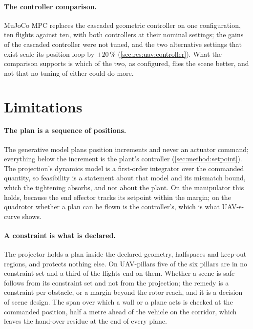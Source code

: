 \paragraph{The controller comparison.} MuJoCo MPC replaces the cascaded geometric controller on one
configuration, ten flights against ten, with both controllers at their nominal settings; the gains of
the cascaded controller were not tuned, and the two alternative settings that exist scale its position
loop by $\pm20\,\%$ (\autoref{sec:res:uav:controller}). What the comparison supports is which of the
two, as configured, flies the scene better, and not that no tuning of either could do more.

\section{Limitations}\label{sec:disc:limitations}

\paragraph{The plan is a sequence of positions.} The generative model plans position increments and
never an actuator command; everything below the increment is the plant's controller
(\autoref{sec:method:setpoint}). The projection's dynamics model is a first-order integrator over the
commanded quantity, so feasibility is a statement about that model and its mismatch bound, which the
tightening absorbs, and not about the plant. On the manipulator this holds, because the end effector
tracks its setpoint within the margin; on the quadrotor whether a plan can be flown is the
controller's, which is what UAV-s-curve shows.

\paragraph{A constraint is what is declared.} The projector holds a plan inside the declared geometry,
halfspaces and keep-out regions, and protects nothing else. On UAV-pillars five of the six pillars are
in no constraint set and a third of the flights end on them. Whether a scene is safe follows from its
constraint set and not from the projection; the remedy is a constraint per obstacle, or a margin beyond
the rotor reach, and it is a decision of scene design. The span over which a wall or a plane acts is
checked at the commanded position, half a metre ahead of the vehicle on the corridor, which leaves the
hand-over residue at the end of every plane.

